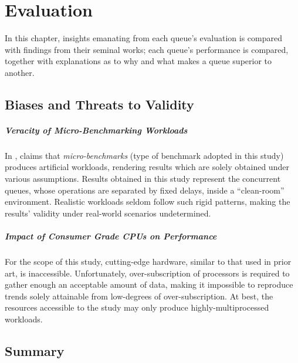 \chapter{Evaluation}
In this chapter, insights emanating from each queue's evaluation is compared
with findings from their seminal works; each queue's performance is compared, 
together with explanations as to why and what makes a queue superior to another.


\section{Biases and Threats to Validity}
\paragraph{Veracity of Micro-Benchmarking Workloads}
In \citep{gregg2014systems}, \citeauthor{gregg2014systems} claims that
\emph{micro-benchmarks} (type of benchmark adopted in this study) produces
artificial workloads, rendering results which are  solely obtained under
various assumptions. Results obtained in this study represent the concurrent
queues, whose operations are separated by fixed delays, inside a ``clean-room''
environment. Realistic workloads seldom follow such rigid patterns, making the
results' validity under real-world scenarios undetermined.

\paragraph{Impact of Consumer Grade CPUs on Performance}
For the scope of this study, cutting-edge hardware, similar to that used in
prior art, is inaccessible. Unfortunately, over-subscription of processors
is required to gather enough an acceptable amount of data, making it
impossible to reproduce trends solely attainable from low-degrees of over-subscription. At
best, the resources accessible to the study may only produce
highly-multiprocessed workloads.

\section{Summary}
